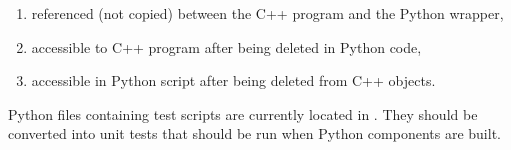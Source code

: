\begin{enumerate}
\item referenced (not copied) between the C++ program and the Python wrapper,
\item accessible to C++ program after being deleted in Python code,
\item accessible in Python script after being deleted from C++ objects.
\end{enumerate}

Python files containing test scripts are currently located in 
. They should be converted into unit tests 
that should be run when Python components are built.
